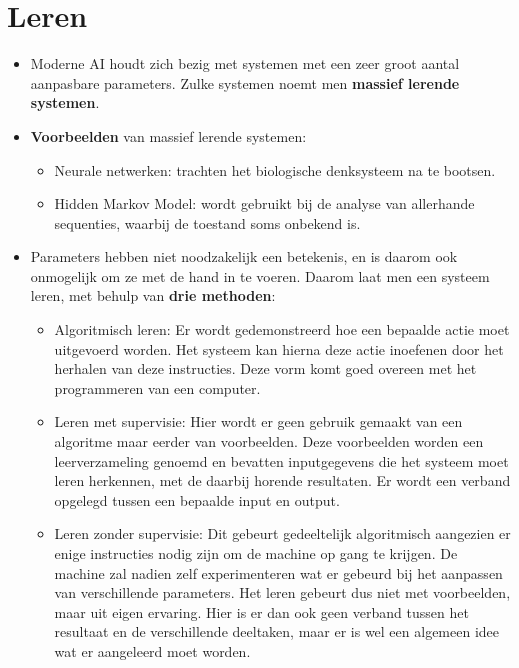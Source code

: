 \documentclass{report}
\begin{document}
\section{Leren}
\begin{itemize}
	\item Moderne AI houdt zich bezig met systemen met een zeer groot aantal aanpasbare parameters. Zulke systemen noemt men \textbf{massief lerende systemen}.
	\item \textbf{Voorbeelden} van massief lerende systemen:
	\begin{itemize}
		\item Neurale netwerken: trachten het biologische denksysteem na te bootsen.
		\item Hidden Markov Model: wordt gebruikt bij de analyse van allerhande sequenties, waarbij de toestand soms onbekend is.
	\end{itemize}
	\item Parameters hebben niet noodzakelijk een betekenis, en is daarom ook onmogelijk om ze met de hand in te voeren. Daarom laat men een systeem leren, met behulp van \textbf{drie methoden}:
	\begin{itemize}
		\item Algoritmisch leren: Er wordt gedemonstreerd hoe een bepaalde actie moet uitgevoerd worden. Het systeem kan hierna deze actie inoefenen door het herhalen van deze instructies. Deze vorm komt goed overeen met het programmeren van een computer.
		\item Leren met supervisie: Hier wordt er geen gebruik gemaakt van een algoritme maar eerder van voorbeelden. Deze voorbeelden worden een leerverzameling genoemd en bevatten inputgegevens die het systeem moet leren herkennen, met de daarbij horende resultaten. Er wordt een verband opgelegd tussen een bepaalde input en output.
		\item Leren zonder supervisie: Dit gebeurt gedeeltelijk algoritmisch aangezien er enige instructies nodig zijn om de machine op gang te krijgen. De machine zal nadien zelf experimenteren wat er gebeurd bij het aanpassen van verschillende parameters. Het leren gebeurt dus niet met voorbeelden, maar uit eigen ervaring. Hier is er dan ook geen verband tussen het resultaat en de verschillende deeltaken, maar er is wel een algemeen idee wat er aangeleerd moet worden.
	\end{itemize}
\end{itemize}
\end{document}
